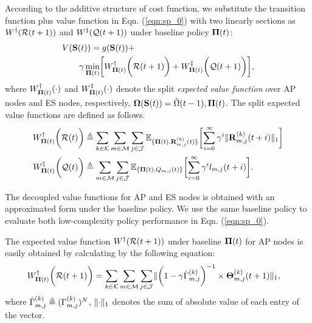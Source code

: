 According to the additive structure of cost function, we substitute the transition function plus value function in Eqn. (\ref{eqn:sp_0}) with two linearly sections as $W^{\dagger}(\mathcal{R}(t+1))$ and $W^{\ddagger}(\mathcal{Q}(t+1))$ under baseline policy $\boldsymbol{\Pi}(t)$:
\begin{align}
    &V(\Stat(t)) = g(\Stat(t)) +
    \nonumber\\
    &~~~~~~\gamma \min_{\BaseLine(t)} \Bracket{ W^{\AP}_{\BaseLine(t)}\Paren{\mathcal{R}(t+1)} + W^{\ES}_{\BaseLine(t)}\Paren{\mathcal{Q}(t+1)} },
\end{align}
where $W^{\dagger}_{\boldsymbol{\Pi}(t)}(\cdot)$ and $W^{\ddagger}_{\boldsymbol{\Pi}(t)}(\cdot)$ denote the split \emph{expected value function} over AP nodes and ES nodes, respectively, $\boldsymbol{\Omega}(\mathbf{S}(t)) = \tilde{\Omega}(t-1), \boldsymbol{\Pi}(t)$. The split expected value functions are defined as follows.
\begin{align}
    W^{\AP}_{\BaseLine(t)}\Paren{\mathcal{R}(t)}
        &\define \sum_{k\in\apSet}\sum_{m\in\esSet}\sum_{j\in\jSpace}
        \mathbb{E}_{\{\BaseLine(t), \vec{R}^{(k)}_{m,j}(t)\}}\Bracket{
            \sum_{i=0}^{\infty} \gamma^{i} \Inorm{\vec{R}^{(k)}_{m,j}({t+i})}
        }
    \\
    W^{\ES}_{\BaseLine(t)}\Paren{\mathcal{Q}(t)}
        &\define \sum_{m\in\esSet}\sum_{j\in\jSpace}
        \mathbb{E}_{\{\BaseLine(t), Q_{m,j}(t)\}}\Bracket{
            \sum_{i=0}^{\infty} \gamma^{i} l_{m,j}({t+i})
        }.
\end{align}
        
The decoupled value functions for AP and ES nodes is obtained with an approximated form under the baseline policy. We use the same baseline policy to evaluate both low-complexity policy performance in Eqn. (\ref{eqn:sp_0}).

The expected value function $W^{\dagger}(\mathcal{R}(t+1))$ under baseline $\boldsymbol{\Pi}(t)$ for AP nodes is easily obtained by calculating by the following equation:
\begin{align}
    &W^{\dagger}_{\boldsymbol{\Pi}(t)}\bigg(\mathcal{R}(t+1)\bigg) = \sum_{k\in\mathcal{K}}\sum_{m\in\mathcal{M}}\sum_{j\in\mathcal{J}}
    \lVert
        \bigg(1 - \gamma \hat{\Gamma}^{(k)}_{m,j}\bigg)^{-1}
        \times \boldsymbol{\Theta}^{(k)}_{m,j}(t+1)
    \|_1,
    \label{w_ap}
\end{align}
where $\hat{\Gamma}^{(k)}_{m,j} \triangleq (\Gamma^{(k)}_{m,j})^{N}$, $\lVert\cdot\|_1$ denotes the sum of absolute value of each entry of the vector.

